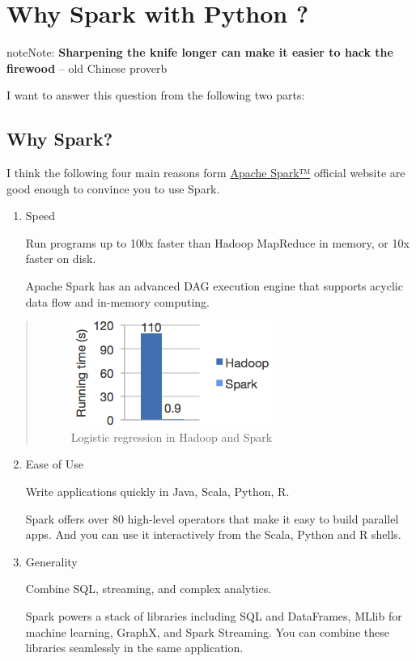 \documentclass[letterpaper,11pt,english]{sphinxmanual}
\begin{document}
\chapter{Why Spark with Python ?}
\label{why:university-of-minnesota-twin-cities}\label{why::doc}\label{why:why}\label{why:why-spark-with-python}
\begin{notice}{note}{Note:}
\textbf{Sharpening the knife longer can make it easier to hack the firewood} -- old Chinese proverb
\end{notice}

I want to answer this question from the following two parts:


\section{Why Spark?}
\label{why:why-spark}
I think the following four main reasons form \href{http://spark.apache.org/}{Apache Spark™} official website are good enough
to convince you to use Spark.
\begin{enumerate}
\item {} 
Speed

Run programs up to 100x faster than Hadoop MapReduce in memory, or 10x faster on disk.

Apache Spark has an advanced DAG execution engine that supports acyclic data flow and in-memory computing.

\end{enumerate}
\begin{quote}
\begin{figure}[htbp]
\centering
\capstart

\includegraphics{logistic-regression.png}
\caption{Logistic regression in Hadoop and Spark}\label{why:fig-lr}\end{figure}
\end{quote}
\begin{enumerate}
\setcounter{enumi}{1}
\item {} 
Ease of Use

Write applications quickly in Java, Scala, Python, R.

Spark offers over 80 high-level operators that make it easy to build parallel apps. And you can use it interactively from the Scala, Python and R shells.

\item {} 
Generality

Combine SQL, streaming, and complex analytics.

Spark powers a stack of libraries including SQL and DataFrames, MLlib for machine learning, GraphX, and Spark Streaming. You can combine these libraries seamlessly in the same application.

\end{enumerate}
\end{document}
